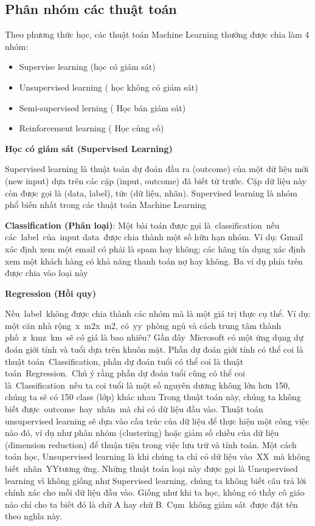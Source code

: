 \subsection{Phân nhóm các thuật toán}
Theo phương thức học, các thuật toán Machine Learning thường được chia làm 4 nhóm:
\begin{itemize}
\item Supervise learning (học có giám sát)
\item Unsupervised learning ( học không có giám sát)
\item Semi-supervised lerning ( Học bán giám sát)
\item Reinforcement learning ( Học củng cố)
\end{itemize}
\textbf{Học có giám sát (Supervised Learning)}
\par
Supervised learning là thuật toán dự đoán đầu ra (outcome) của một dữ liệu mới (new input) dựa trên các cặp (input, outcome) đã biết từ trước. Cặp dữ liệu này còn được gọi là (data, label), tức (dữ liệu, nhãn). Supervised learning là nhóm phổ biến nhất trong các thuật toán Machine Learning
\par
\textbf{Classification (Phân loại)}: Một bài toán được gọi là classification nếu các label của input data được chia thành một số hữu hạn nhóm. Ví dụ: Gmail xác định xem một email có phải là spam hay không; các hãng tín dụng xác định xem một khách hàng có khả năng thanh toán nợ hay không. Ba ví dụ phía trên được chia vào loại này
\par
\textbf{Regression (Hồi quy)}
\par
Nếu label không được chia thành các nhóm mà là một giá trị thực cụ thể. Ví dụ: một căn nhà rộng x m2x m2, có yy phòng ngủ và cách trung tâm thành phố z kmz km sẽ có giá là bao nhiêu?
Gần đây Microsoft có một ứng dụng dự đoán giới tính và tuổi dựa trên khuôn mặt. Phần dự đoán giới tính có thể coi là thuật toán Classification, phần dự đoán tuổi có thể coi là thuật toán Regression. Chú ý rằng phần dự đoán tuổi cũng có thể coi là Classification nếu ta coi tuổi là một số nguyên dương không lớn hơn 150, chúng ta sẽ có 150 class (lớp) khác nhau
Trong thuật toán này, chúng ta không biết được outcome hay nhãn mà chỉ có dữ liệu đầu vào. Thuật toán unsupervised learning sẽ dựa vào cấu trúc của dữ liệu để thực hiện một công việc nào đó, ví dụ như phân nhóm (clustering) hoặc giảm số chiều của dữ liệu (dimension reduction) để thuận tiện trong việc lưu trữ và tính toán.
Một cách toán học, Unsupervised learning là khi chúng ta chỉ có dữ liệu vào XX mà không biết nhãn YYtương ứng.
Những thuật toán loại này được gọi là Unsupervised learning vì không giống như Supervised learning, chúng ta không biết câu trả lời chính xác cho mỗi dữ liệu đầu vào. Giống như khi ta học, không có thầy cô giáo nào chỉ cho ta biết đó là chữ A hay chữ B. Cụm không giám sát được đặt tên theo nghĩa này.
